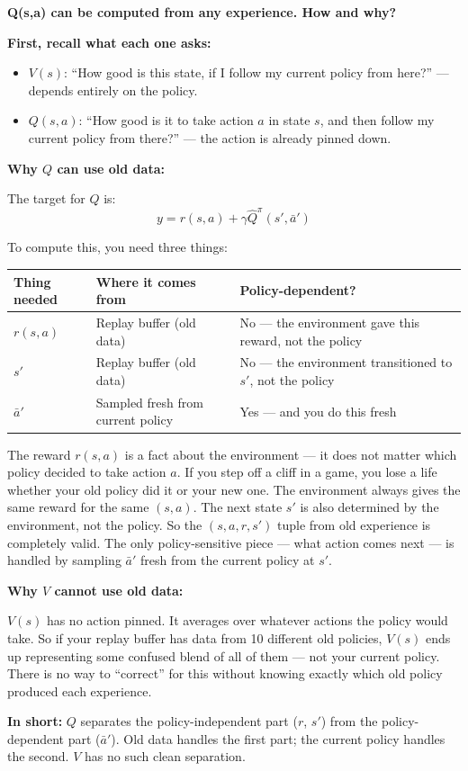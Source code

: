 \bigskip

\textbf{Q(s,a) can be computed from any experience. How and why?}

\medskip
\textbf{First, recall what each one asks:}
\begin{itemize}
    \item $V(s)$: ``How good is this state, if I follow my current policy from
          here?'' --- depends entirely on the policy.
    \item $Q(s, a)$: ``How good is it to take action $a$ in state $s$, and then
          follow my current policy from there?'' --- the action is already pinned down.
\end{itemize}

\medskip
\textbf{Why $Q$ can use old data:}

The target for $Q$ is:
\[
    y = r(s, a) + \gamma \hat{Q}^{\pi}(s', \bar{a}')
\]

To compute this, you need three things:

\begin{tabular}{p{3cm} p{5cm} p{5cm}}
\hline
\textbf{Thing needed} & \textbf{Where it comes from} & \textbf{Policy-dependent?} \\
\hline
$r(s, a)$ & Replay buffer (old data) & No --- the environment gave this reward, not the policy \\[4pt]
$s'$ & Replay buffer (old data) & No --- the environment transitioned to $s'$, not the policy \\[4pt]
$\bar{a}'$ & Sampled fresh from current policy & Yes --- and you do this fresh \\
\hline
\end{tabular}

\medskip
The reward $r(s, a)$ is a fact about the environment --- it does not matter which
policy decided to take action $a$. If you step off a cliff in a game, you lose a
life whether your old policy did it or your new one. The environment always gives
the same reward for the same $(s, a)$. The next state $s'$ is also determined by
the environment, not the policy. So the $(s, a, r, s')$ tuple from old experience
is completely valid. The only policy-sensitive piece --- what action comes next ---
is handled by sampling $\bar{a}'$ fresh from the current policy at $s'$.

\medskip
\textbf{Why $V$ cannot use old data:}

$V(s)$ has no action pinned. It averages over whatever actions the policy would
take. So if your replay buffer has data from 10 different old policies, $V(s)$
ends up representing some confused blend of all of them --- not your current policy.
There is no way to ``correct'' for this without knowing exactly which old policy
produced each experience.

\medskip
\textbf{In short:} $Q$ separates the policy-independent part ($r$, $s'$) from the
policy-dependent part ($\bar{a}'$). Old data handles the first part; the current
policy handles the second. $V$ has no such clean separation.